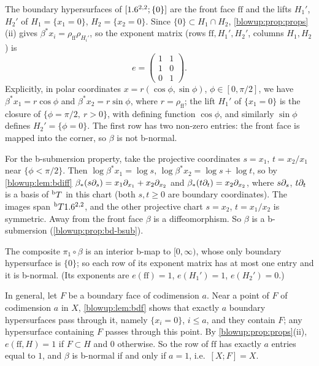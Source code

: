 The boundary hypersurfaces of $[1.6^{2,2};\{0\}]$ are the front face $\mathrm{ff}$ and the lifts
$H_1'$, $H_2'$ of $H_1=\{x_1=0\}$, $H_2=\{x_2=0\}$. Since $\{0\}\subset H_1\cap H_2$,
\cref{blowup:prop:props}(ii) gives $\beta^*x_i=\rho_{\mathrm{ff}}\rho_{H_i'}$, so the exponent matrix
(rows $\mathrm{ff},H_1',H_2'$, columns $H_1,H_2$) is
\begin{equation*}
  e=\begin{pmatrix}1&1\\1&0\\0&1\end{pmatrix}.
\end{equation*}
Explicitly, in polar coordinates $x=r(\cos\phi,\sin\phi)$, $\phi\in[0,\pi/2]$, we have
$\beta^*x_1=r\cos\phi$ and $\beta^*x_2=r\sin\phi$, where $r=\rho_{\mathrm{ff}}$; the lift $H_1'$ of
$\{x_1=0\}$ is the closure of $\{\phi=\pi/2,\ r>0\}$, with defining function $\cos\phi$, and
similarly $\sin\phi$ defines $H_2'=\{\phi=0\}$. The first row has two
non-zero entries: the front face is mapped into the corner, so $\beta$ is not b-normal.

For the b-submersion property, take the projective coordinates $s=x_1$, $t=x_2/x_1$ near
$\{\phi<\pi/2\}$. Then $\log\beta^*x_1=\log s$, $\log\beta^*x_2=\log s+\log t$, so by
\cref{blowup:lem:bdiff} $\beta_*(s\partial_s)=x_1\partial_{x_1}+x_2\partial_{x_2}$ and
$\beta_*(t\partial_t)=x_2\partial_{x_2}$, where $s\partial_s$, $t\partial_t$ is a basis of ${}^{\mathrm{b}}T$ in this chart (both
$s,t\ge0$ are boundary coordinates). The images span ${}^{\mathrm{b}}T1.6^{2,2}$, and the other projective chart
$s=x_2$, $t=x_1/x_2$ is symmetric. Away from the front face $\beta$ is a diffeomorphism. So $\beta$
is a b-submersion (\cref{blowup:prop:bd-bsub}).

The composite $\pi_1\circ\beta$ is an interior b-map to $[0,\infty)$, whose only boundary
hypersurface is $\{0\}$; so each row of its exponent matrix has at most one entry and it is
b-normal. (Its exponents are $e(\mathrm{ff})=1$, $e(H_1')=1$, $e(H_2')=0$.)

In general, let $F$ be a boundary face of codimension $a$. Near a point of $F$ of
codimension $a$ in $X$, \cref{blowup:lem:bdf} shows that exactly $a$ boundary hypersurfaces pass
through it, namely $\{x_i=0\}$, $i\le a$, and they contain $F$; any hypersurface containing $F$
passes through this point. By \cref{blowup:prop:props}(ii), $e(\mathrm{ff},H)=1$ if $F\subset H$ and
$0$ otherwise. So the row of $\mathrm{ff}$ has exactly $a$ entries equal to $1$, and $\beta$ is b-normal
if and only if $a=1$, i.e.\ $[X;F]=X$.

